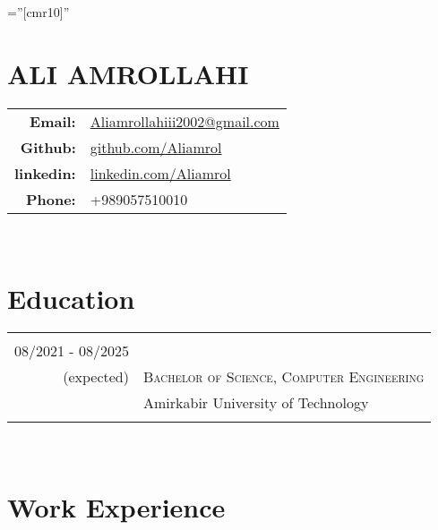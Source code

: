 \documentclass[a4paper,10pt]{article} %
\begin{document}
\pagestyle{empty} %
\font\fb=''[cmr10]'' %


\section{ALI AMROLLAHI}

\begin{tabular}{rl}
\textbf{Email:}   &  \href{mailto:aliamrollahiii2002@gmail.com}{Aliamrollahiii2002@gmail.com}\\
\textbf{Github:} 					& \href{https://github.com/Aliamrol}{github.com/Aliamrol} \\  
\textbf{linkedin:} 					& \href{https://www.linkedin.com/in/ali-amrollahi-12383022a/}{linkedin.com/Aliamrol} \\  
\textbf{Phone:} 					& 
+989057510010 \\

\end{tabular}
\\
\section{Education}
\begin{tabular}{r|l}	

\multicolumn{2}{c}{} \\	%

08/2021 - 08/2025\\(expected) 							& \textsc{Bachelor of Science, Computer Engineering}\\
          							& Amirkabir University of Technology  \\
\\

\end{tabular}
\\


\section{Work Experience}
\end{document}
